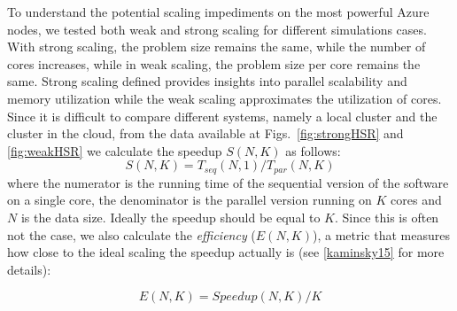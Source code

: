 \documentclass[3p,times]{elsarticle}
\begin{document}
To understand the potential scaling impediments on the most powerful Azure nodes, we tested both weak and strong scaling for different simulations cases. With strong scaling, the problem size remains the same, while the number of cores increases, while in weak scaling, the problem size per core remains the same. Strong scaling defined  provides insights into parallel scalability and memory utilization while the weak scaling approximates the utilization of cores. Since it is difficult to compare different systems, namely a local cluster and the cluster in the cloud, from the data available at Figs.~\ref{fig:strongHSR} and \ref{fig:weakHSR} we calculate the speedup $S(N,K)$ as follows: 
$$
S(N,K) = T_{seq}(N,1) / T_{par}(N,K)
$$
where the numerator is the running time of the sequential version of the software on a single core, the denominator is the parallel version running on $K$ cores and $N$ is the data size. Ideally the speedup should be equal to $K$. Since this is often not the case, we also calculate the \textit{efficiency} ($E(N,K)$), a metric that measures how close to the ideal scaling the speedup actually is (see \ref{kaminsky15} for more details):

$$
E(N,K) = Speedup (N,K) / K
$$
 
\end{document}
